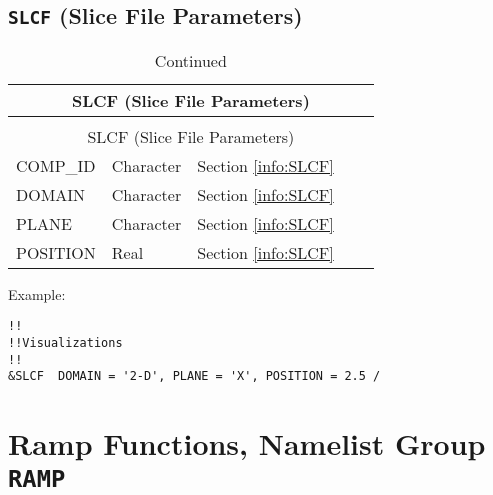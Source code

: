 \subsection{\texorpdfstring{{\tt SLCF}}{SLCF} (Slice File Parameters)}
\begin{longtable}{@{\extracolsep{\fill}}|l|l|l|l|l|}
\caption[Slice File parameters ({\ct SLCF} namelist group)]{For more information see Section~\ref{info:SLCF}.}
\label{tbl:SLCF} \\
\hline
\multicolumn{5}{|c|}{{\ct SLCF} (Slice File Parameters)} \\
\hline \hline
\endfirsthead
\caption[]{Continued} \\
\hline
\multicolumn{5}{|c|}{{\ct SLCF} (Slice File Parameters)} \\
\hline \hline
\endhead
{\ct COMP\_ID}        & Character   & Section \ref{info:SLCF}                 &           &                 \\ \hline
{\ct DOMAIN}            & Character   & Section \ref{info:SLCF}                 &           &                 \\ \hline
{\ct PLANE}             & Character   & Section \ref{info:SLCF}                 &           &                 \\ \hline
{\ct POSITION}          & Real        & Section \ref{info:SLCF}                 &           &                 \\ \hline
\end{longtable}

\noindent Example:
\begin{lstlisting}
!!
!!Visualizations
!!
&SLCF  DOMAIN = '2-D', PLANE = 'X', POSITION = 2.5 /
\end{lstlisting}




\clearpage
\section{Ramp Functions, Namelist Group \texorpdfstring{{\tt RAMP}}{RAMP}}
\label{info:RAMP}
\label{info:RAMP2}

